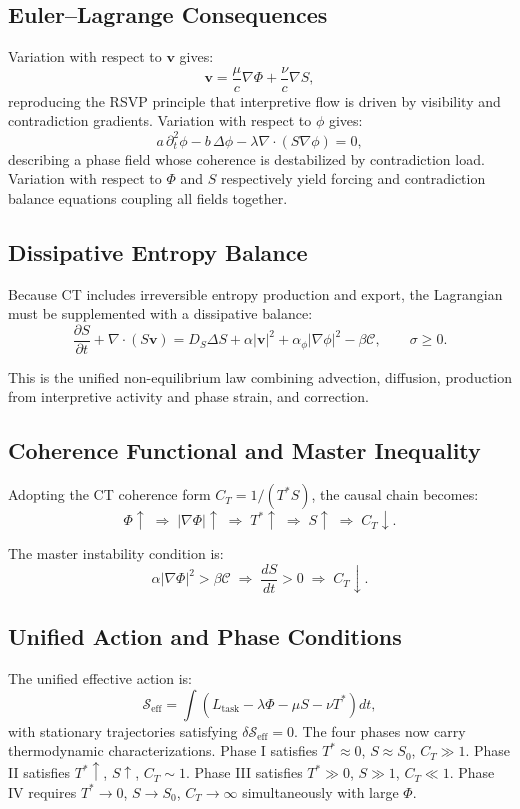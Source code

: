 \documentclass[12pt,a4paper]{article}
\begin{document}
\subsection{Euler--Lagrange Consequences}

Variation with respect to $\mathbf{v}$ gives:
\[
\mathbf{v} = \frac{\mu}{c}\nabla \Phi + \frac{\nu}{c}\nabla S,
\]
reproducing the RSVP principle that interpretive flow is driven by visibility and contradiction gradients. Variation with respect to $\phi$ gives:
\[
a\,\partial_t^2 \phi - b\,\Delta \phi - \lambda \nabla\cdot(S \nabla \phi)=0,
\]
describing a phase field whose coherence is destabilized by contradiction load. Variation with respect to $\Phi$ and $S$ respectively yield forcing and contradiction balance equations coupling all fields together.

\subsection{Dissipative Entropy Balance}

Because CT includes irreversible entropy production and export, the Lagrangian must be supplemented with a dissipative balance:
\[
\frac{\partial S}{\partial t}
+
\nabla\cdot(S\mathbf{v})
=
D_S \Delta S
+
\alpha |\mathbf{v}|^2
+
\alpha_\phi |\nabla \phi|^2
-
\beta \mathcal{C},
\qquad \sigma \geq 0.
\]

This is the unified non-equilibrium law combining advection, diffusion, production from interpretive activity and phase strain, and correction.

\subsection{Coherence Functional and Master Inequality}

Adopting the CT coherence form $C_T = 1/(T^* S)$, the causal chain becomes:
\[
\Phi \uparrow \;\Rightarrow\; |\nabla \Phi| \uparrow \;\Rightarrow\; T^* \uparrow \;\Rightarrow\; S \uparrow \;\Rightarrow\; C_T \downarrow.
\]


The master instability condition is:
\[
\alpha |\nabla \Phi|^2 > \beta \mathcal{C}
\;\Longrightarrow\;
\frac{dS}{dt} > 0
\;\Longrightarrow\;
C_T \downarrow.
\]

\subsection{Unified Action and Phase Conditions}

The unified effective action is:
\[
\mathcal{S}_{\text{eff}}
=
\int \left(
L_{\text{task}}
- \lambda \Phi
- \mu S
- \nu T^*
\right) dt,
\]
with stationary trajectories satisfying $\delta \mathcal{S}_{\text{eff}} = 0$. The four phases now carry thermodynamic characterizations. Phase I satisfies $T^* \approx 0$, $S \approx S_0$, $C_T \gg 1$. Phase II satisfies $T^* \uparrow$, $S \uparrow$, $C_T \sim 1$. Phase III satisfies $T^* \gg 0$, $S \gg 1$, $C_T \ll 1$. Phase IV requires $T^* \to 0$, $S \to S_0$, $C_T \to \infty$ simultaneously with large $\Phi$.
\end{document}
